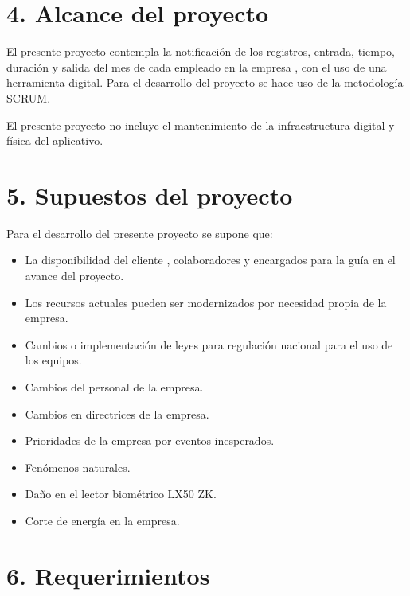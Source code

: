 \documentclass[
11pt, %
]{charter}
\begin{document}
\section{4. Alcance del proyecto}
\label{sec:alcance}




El presente proyecto contempla la notificación de los registros, entrada,
tiempo, duración y salida del mes de cada empleado en la empresa \empclientename, con el uso de una herramienta digital. Para el desarrollo del proyecto se hace uso de la metodología SCRUM.

El presente proyecto no incluye el mantenimiento de la infraestructura digital y física del
aplicativo.




\section{5. Supuestos del proyecto}
\label{sec:supuestos}



Para el desarrollo del presente proyecto se supone que: 

\begin{itemize}
	\item La disponibilidad del cliente \clientename, colaboradores y encargados para la guía en el avance del proyecto. 
	\item Los recursos actuales pueden ser modernizados por necesidad propia de la empresa.
	\item Cambios o implementación de leyes para regulación nacional para el uso de los equipos.
	\item Cambios del personal de la empresa.
	\item Cambios en directrices de la empresa.
	\item Prioridades de la empresa por eventos inesperados.
	\item Fenómenos naturales.
	\item Daño en el lector biométrico LX50 ZK.
	\item Corte de energía en la empresa.
\end{itemize}



\section{6. Requerimientos}
\label{sec:requerimientos}
\end{document}
